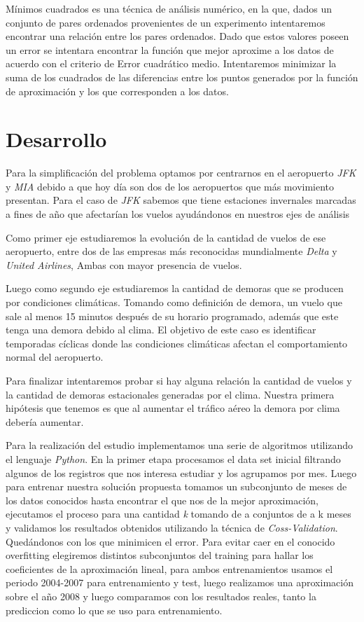 \documentclass{endm}
\begin{document}
Mínimos cuadrados es una técnica de análisis numérico, en la que, dados un conjunto de pares ordenados provenientes de un experimento intentaremos encontrar una relación entre los pares ordenados. Dado que estos valores poseen un error se intentara encontrar la función que mejor aproxime a los datos de acuerdo con el criterio de Error cuadrático medio. Intentaremos minimizar la suma de los cuadrados de las diferencias entre los puntos generados por la función de aproximación y los que corresponden a los datos.

\section{Desarrollo}

Para la simplificación del problema optamos por centrarnos en el aeropuerto \textit{JFK} y \textit{MIA} debido a que hoy día son dos de los aeropuertos que más movimiento presentan. Para el caso de \textit{JFK} sabemos que tiene estaciones invernales marcadas a fines de año que afectarían los vuelos ayudándonos en nuestros ejes de análisis

Como primer eje estudiaremos la evolución de la cantidad de vuelos de ese aeropuerto, entre dos de las empresas más reconocidas mundialmente \textit{Delta} y \textit{United Airlines}, Ambas con mayor presencia de vuelos. 

Luego como segundo eje estudiaremos la cantidad de demoras que se producen por condiciones climáticas. Tomando como definición de demora, un vuelo que sale al menos 15 minutos después de su horario programado, además que este tenga una demora debido al clima.
El objetivo de este caso es identificar temporadas cíclicas donde las condiciones climáticas afectan el comportamiento normal del aeropuerto. 

Para finalizar intentaremos probar si hay alguna relación la cantidad de vuelos y la cantidad de demoras estacionales generadas por el clima. Nuestra primera hipótesis que tenemos es que al aumentar el tráfico aéreo la demora por clima debería aumentar.

Para la realización del estudio implementamos una serie de algoritmos utilizando el lenguaje \textit{Python}. En la primer etapa procesamos el data set inicial filtrando algunos de los registros que nos interesa estudiar y los agrupamos por mes. Luego para entrenar nuestra solución propuesta tomamos un subconjunto de meses de los datos conocidos hasta encontrar el que nos de la mejor aproximación, ejecutamos el proceso para una cantidad \textit{k} tomando de a conjuntos de a k meses y validamos los resultados obtenidos utilizando la técnica de \textit{Coss-Validation}. Quedándonos con los que minimicen el error. Para evitar caer en el conocido overfitting elegiremos distintos subconjuntos del training para hallar los coeficientes de la aproximación lineal, para ambos entrenamientos usamos el periodo 2004-2007 para entrenamiento y test, luego realizamos una aproximación sobre el año 2008 y luego comparamos con los resultados reales, tanto la prediccion como lo que se uso para entrenamiento.
\end{document}
